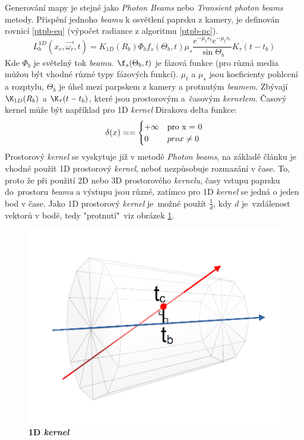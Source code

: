 Generování mapy je stejné jako \textit{Photon Beams} nebo \textit{Transient photon beams} metody. Přispění jednoho \textit{beamu} k osvětlení paprsku z kamery, je definován rovnicí \ref{ptpb-eq}\cite{ptpb} (výpočet radiance z algoritmu \ref{ptpb-pc}).
\begin{equation}
 \label{ptpb-eq}
    L_b^{1D}(x_r,\vec{\omega_r},t) = K_{1D}(R_b)\Phi_b f_s(\Theta_b, t)\mu_s \frac{e^{-\mu_t s_b}e^{-\mu_t s_r}}{\sin{\Theta_b}}K_\tau(t - t_b)
\end{equation}
Kde $\Phi_b$ je světelný tok \textit{beamu}. $\f_s(\Theta_b,t)$ je fázová funkce (pro různá media můžou být vhodné různé typy fázových funkcí). $\mu_t$ a $\mu_s$ jsou koeficienty pohlcení a rozptylu, $\Theta_b$ je úhel mezi parpskem z kamery a protnutým \textit{beamem}. Zbývají $\K_{1D}(R_b)$ a $\K_{\tau}(t-t_b)$, které jsou prostorovým a~časovým \textit{kernelem}. Časový kernel může být například pro 1D \textit{kernel} Dirakova delta funkce:
\begin{equation}
 \label{dirak-delta}
   \delta(x) = =\begin{cases}
    $$+ \infty$$ & $pro x = 0$\\
    0 &  $$pro x \neq 0$$
  \end{cases}
\end{equation}
Prostorový \textit{kernel} se vyskytuje již v metodě \textit{Photon beams}, na základě článku \cite{ptpb} je vhodné použít 1D prostorový \textit{kernel}, neboť nezpůsobuje rozmazání v čase. To, proto že při použití 2D nebo 3D prostorového \textit{kernelu}, časy vstupu paprsku do~prostoru \textit{beamu} a výstupu jsou různé, zatímco pro 1D \textit{kernel} se jedná o jeden bod v čase. Jako 1D prostorový \textit{kernel} je~možné použít $\frac{1}{d}$, kdy $d$ je~vzdálenost vektorů v bodě, tedy "protnutí"~viz obrázek \ref{1d}.
\begin{figure}[h]\centering
\includegraphics[width=0.5\linewidth]{obrazky-figures/1DKernel.png}\hfill
  \caption{\textbf{1D \textit{kernel}}}
  \label{1d}
\end{figure}

